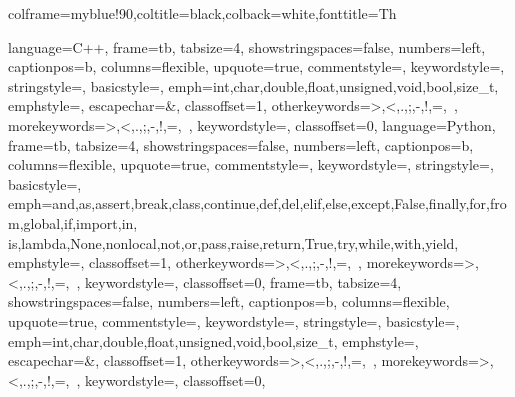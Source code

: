 \usepackage{pgfplots} %
\usepackage{tikz}
\usetikzlibrary{3d,perspective,decorations.text}
\usetikzlibrary{animations}
\usetikzlibrary{positioning}
\usetikzlibrary{matrix}
\usepackage{tikz-cd}
\usetikzlibrary{cd}
\usetikzlibrary{karnaugh}
\pgfplotsset{width=6cm,compat=newest}
\usepackage{color}

\usepackage[framemethod=TikZ]{mdframed}
\newcommand{\definebox}[2]{\newcounter{#1}\newenvironment{#1}[1][]{\stepcounter{#1}\mdfsetup{frametitle={\tikz[baseline=(current bounding box.east),outer sep=0pt]\node[anchor=east,rectangle,fill=white]{\strut \MakeUppercase#1~\csname the#1\endcsname\ifstrempty{##1}{}{:~##1}};}}\mdfsetup{innertopmargin=1pt,linecolor=#2,linewidth=3pt,topline=true,frametitleaboveskip=\dimexpr-\ht\strutbox\relax,}\begin{mdframed}[]\relax}{\end{mdframed}}}
\definebox{definition}{black!90}
\definebox{theorem}{myblue1!90}
\definebox{demonstration}{amethyst!90}

\def\themytheorem{\thesection.\arabic{Theorem}}
\usepackage[most]{tcolorbox}
{colframe=myblue!90,coltitle=black,colback=white,fonttitle=\bfseries}{Th}

\usepackage{matlab-prettifier}

\lstset{
    extendedchars=\true,
}
 {
    language=C++,
    frame=tb,
    tabsize=4,
    showstringspaces=false,
    numbers=left,
    captionpos=b,
    columns=flexible,
    upquote=true,
    commentstyle=\color{commentgreen},
    keywordstyle=\color{blue},
    stringstyle=\color{commentgreen},
    basicstyle=\small\ttfamily,
    emph={int,char,double,float,unsigned,void,bool,size\_t},
    emphstyle={\color{blue}},
    escapechar=\&,
    classoffset=1,
    otherkeywords={>,<,.,;,-,!,=,~},
    morekeywords={>,<,.,;,-,!,=,~},
    keywordstyle=\color{black},
    classoffset=0,
}
 {
    language=Python,
    frame=tb,
    tabsize=4,
    showstringspaces=false,
    numbers=left,
    captionpos=b,
    columns=flexible,
    upquote=true,
    commentstyle=\color{commentgreen},
    keywordstyle=\color{blue},
    stringstyle=\color{commentgreen},
    basicstyle=\small\ttfamily,
    emph={and,as,assert,break,class,continue,def,del,elif,else,except,False,finally,for,from,global,if,import,in,%
    is,lambda,None,nonlocal,not,or,pass,raise,return,True,try,while,with,yield},
    emphstyle={\color{blue}},
    classoffset=1,
    otherkeywords={>,<,.,;,-,!,=,~},
    morekeywords={>,<,.,;,-,!,=,~},
    keywordstyle=\color{black},
    classoffset=0,
}
 {
    frame=tb,
    tabsize=4,
    showstringspaces=false,
    numbers=left,
    captionpos=b,
    columns=flexible,
    upquote=true,
    commentstyle=\color{black},
    keywordstyle=\color{black},
    stringstyle=\color{black},
    basicstyle=\small\ttfamily,
    emph={int,char,double,float,unsigned,void,bool,size\_t},
    emphstyle={\color{black}},
    escapechar=\&,
    classoffset=1,
    otherkeywords={>,<,.,;,-,!,=,~},
    morekeywords={>,<,.,;,-,!,=,~},
    keywordstyle=\color{black},
    classoffset=0,
}

